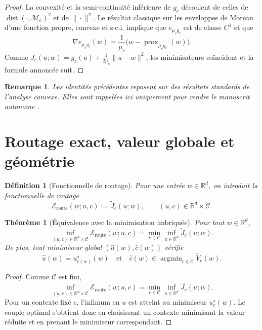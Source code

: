 \documentclass[11pt,a4paper]{article}
\newtheorem{definition}{Définition}[section]
\newtheorem{theorem}{Théorème}[section]
\newtheorem{remark}{Remarque}[section]
\DeclareMathOperator{\prox}{prox}
\DeclareMathOperator{\argmin}{argmin}
\DeclareMathOperator{\dist}{dist}
\newcommand{\R}{\mathbb R}
\newcommand{\Mcal}{\mathcal M}
\newcommand{\Ccal}{\mathcal C}
\begin{document}
\begin{proof}
La convexité et la semi-continuité inférieure de \(g_c\) découlent de celles de \(\dist(\cdot,\Mcal_c)^2\) et de \(\|\cdot\|^2\). Le résultat classique sur les enveloppes de Moreau d'une fonction propre, convexe et s.c.i. implique que \(e_{\mu_c g_c}\) est de classe \(C^1\) et que
\[
\nabla e_{\mu_c g_c}(w)=\frac{1}{\mu_c}\bigl(w-\prox_{\mu_c g_c}(w)\bigr).
\]
Comme \(\widetilde J_c(u;w)=g_c(u)+\frac{1}{2\mu_c}\|u-w\|^2\), les minimisateurs coïncident et la formule annoncée suit.
\end{proof}

\begin{remark}
Les identités précédentes reposent sur des résultats standards de l'analyse convexe. Elles sont rappelées ici uniquement pour rendre le manuscrit autonome \cite{Moreau1965,Rockafellar1970,BauschkeCombettes2017,RockafellarWets1998}.
\end{remark}

\section{Routage exact, valeur globale et géométrie}

\begin{definition}[Fonctionnelle de routage]
Pour une entrée \(w\in\R^d\), on introduit la fonctionnelle de routage
\[
\mathcal E_{\mathrm{route}}(w;u,c):=\widetilde J_c(u;w),
\qquad
(u,c)
\in \R^d\times\Ccal.
\]
\end{definition}

\begin{theorem}[Équivalence avec la minimisation imbriquée]
Pour tout \(w\in\R^d\),
\[
\inf_{(u,c)\in \R^d\times\Ccal}\mathcal E_{\mathrm{route}}(w;u,c)
=
\min_{c\in\Ccal}\inf_{u\in\R^d}\widetilde J_c(u;w).
\]
De plus, tout minimiseur global \((\hat u(w),\hat c(w))\) vérifie
\[
\hat u(w)=u_{\hat c(w)}^\star(w)
\quad\text{et}\quad
\hat c(w)\in\argmin_{c\in\Ccal}\widetilde V_c(w).
\]
\end{theorem}

\begin{proof}
Comme \(\Ccal\) est fini,
\[
\inf_{(u,c)\in \R^d\times\Ccal}\mathcal E_{\mathrm{route}}(w;u,c)
=
\min_{c\in\Ccal}\inf_{u\in\R^d}\widetilde J_c(u;w).
\]
Pour un contexte fixé \(c\), l'infimum en \(u\) est atteint au minimiseur \(u_c^\star(w)\). Le couple optimal s'obtient donc en choisissant un contexte minimisant la valeur réduite et en prenant le minimiseur correspondant.
\end{proof}
\end{document}
